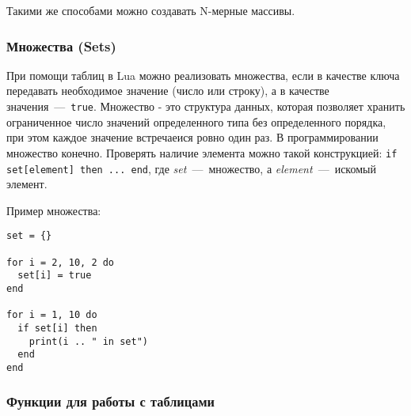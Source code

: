 Такими же способами можно создавать N-мерные массивы.

\subsubsection{Множества (Sets)}


При помощи таблиц в Lua можно реализовать множества, если в качестве ключа передавать необходимое значение (число или строку), 
а в качестве значения~---~\lstinline{true}. Множество - это структура данных, которая позволяет хранить ограниченное число значений определенного типа без определенного порядка, при этом каждое значение встречаеися ровно один раз. В программировании множество конечно. Проверять наличие элемента можно такой конструкцией: \lstinline{if set[element] then ... end}, где \emph{set}~---~множество, а \emph{element}~---~искомый элемент.

Пример множества:

\begin{lstlisting}
set = {}

for i = 2, 10, 2 do
  set[i] = true
end

for i = 1, 10 do
  if set[i] then
    print(i .. " in set")  
  end
end
\end{lstlisting}

\subsubsection{Функции для работы с таблицами}

